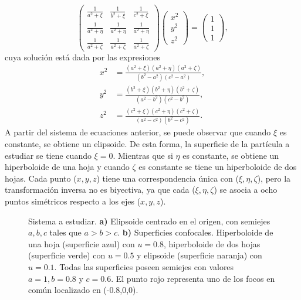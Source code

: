 	\begin{equation*}
		\begin{pmatrix}
			\frac{1}{a^2+\xi} & \frac{1}{b^2+\xi} & \frac{1}{c^2+\xi}\\
			\frac{1}{a^2+\eta} & \frac{1}{a^2+\eta} & \frac{1}{a^2+\eta}\\
			\frac{1}{a^2+\zeta} & \frac{1}{a^2+\zeta} & \frac{1}{a^2+\zeta}\end{pmatrix}\begin{pmatrix}
			x^2\\
			y^2\\
			z^2
		\end{pmatrix}=\begin{pmatrix}
			1\\
			1\\
			1
		\end{pmatrix},
	\end{equation*}
%	
cuya solución está dada por las expresiones
\begin{align}
	x^2&=\frac{(a^2+\xi)(a^2+\eta)(a^2+\zeta)}{(b^2-a^2)(c^2-a^2)},\label{x_elips}\\
	y^2&=\frac{(b^2+\xi)(b^2+\eta)(b^2+\zeta)}{(a^2-b^2)(c^2-b^2)},\label{y_elips}\\
	z^2&=\frac{(c^2+\xi)(c^2+\eta)(c^2+\zeta)}{(a^2-c^2)(b^2-c^2)}. \label{z_elips}    
\end{align}
A partir del sistema de ecuaciones anterior, se puede observar que cuando $\xi$ es constante, se obtiene un elipsoide. De esta forma, la superficie de la partícula a estudiar se tiene cuando $\xi=0$. Mientras que si $\eta$ es constante, se obtiene un hiperboloide de una hoja y cuando $\zeta$ es constante se tiene un hiperboloide de dos hojas. Cada punto ($x,y,z$) tiene una correspondencia única con ($\xi,\eta,\zeta$), pero la transformación inversa no es biyectiva, ya que cada ($\xi,\eta,\zeta$) se asocia a ocho puntos simétricos respecto a los ejes ($x,y,z$). \cite{Cambdrige} \\

\begin{figure}[H]
	\centering
	\caption{Sistema a estudiar. \textbf{a)} Elipsoide centrado en el origen, con semiejes $a, b, c$ tales que $a > b > c.$   \textbf{b)} Superficies confocales. Hiperboloide de una hoja (superficie azul) con $u=0.8$, hiperboloide de dos hojas (superficie verde) con $u=0.5$ y elipsoide (superficie naranja) con $u=0.1$. Todas las superficies poseen semiejes con valores $a=1, b=0.8$ y $c=0.6$. El punto rojo representa uno de los focos en común localizado en (-0.8,0,0).}
	\label{ConfocalQuadrics}
\end{figure}



